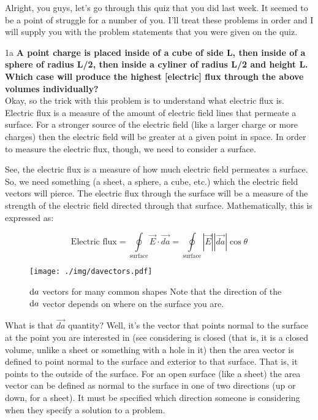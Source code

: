 \begin{homeworkProblem}[Quiz 3, Pr. 1]
        Alright, you guys, let's go through this quiz that you did last
        week. It seemed to be a point of struggle for a number of
        you. I'll treat these problems in order and I will supply you
        with the problem statements that you were given on the quiz.

    \begin{homeworkSection}{1a}
        \textbf{A point charge is placed inside of a cube of side L,
        then inside of a sphere of radius L/2, then inside a cyliner of
        radius L/2 and height L. Which case will produce the highest
        [electric] flux through the above volumes individually?}
        \\

        Okay, so the trick with this problem is to understand what
        electric flux is. Electric flux is a measure of the amount of
        electric field lines that permeate a surface. For a stronger
        source of the electric field (like a larger charge or more
        charges) then the electric field will be greater at a given
        point in space. In order to measure the electric flux, though,
        we need to consider a surface. 
        
        See, the electric flux is a measure of how much electric field
        permeates a surface. So, we need something (a sheet, a sphere, a
        cube, etc.) which the electric field vectors will pierce. The
        electric flux through the surface will be a measure of the
        strength of the electric field directed through that surface.
        Mathematically, this is expressed as:
        
        \[
        \text{Electric flux} = \oint\limits_{\text{surface}}
        \vec{E}\cdot\vec{da} = \oint\limits_{\text{surface}} |\vec{E}|
        |\vec{da}| \cos\theta 
        \]
     
        \begin{figure}[t]
            \centering
            \texttt{[image: ./img/davectors.pdf]}
            \caption{$\mathop{}\!\mathrm{d} a$ vectors for many common shapes
            Note that the direction of the $\mathop{}\!\mathrm{d} a$ vector
            depends on where on the surface you are.}
            \label{fig:davectors.eps}
        \end{figure}

        What is that $\vec{da}$ quantity? Well, it's the vector that
        points normal to the surface at the point you are interested in
        (see %
        considering is closed (that is, it is a closed volume, unlike a
        sheet or something with a hole in it) then the area vector is
        defined to point normal to the surface and exterior to that
        surface. That is, it points to the outside of the surface. For
        an open surface (like a sheet) the area vector can be defined as
        normal to the surface in one of two directions (up or down, for
        a sheet). It must be specified which direction someone is
        considering when they specify a solution to a problem.
        

\end{homeworkSection}
\end{homeworkProblem}
